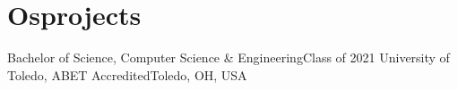 \section{Osprojects}
\mySubHeadingListStart

  \mySubHeading
    {Bachelor of Science, Computer Science \& Engineering}{Class of 2021}
    {University of Toledo, ABET Accredited}{Toledo, OH, USA}
    \myItemListStart
    \myItemListEnd

\mySubHeadingListEnd
